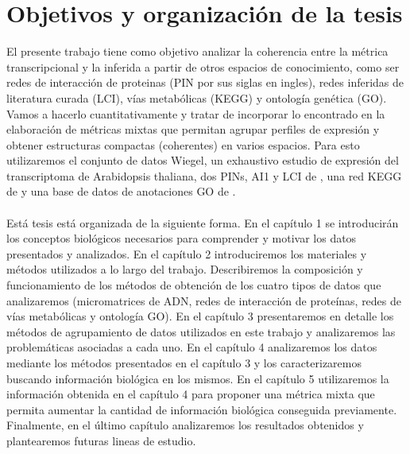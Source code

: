 \section*{Objetivos y organización de la tesis}
El presente trabajo tiene como objetivo analizar la coherencia entre la métrica transcripcional y la inferida a partir de otros espacios de conocimiento, como ser redes de interacción de proteinas (PIN por sus siglas en ingles), redes inferidas de literatura curada (LCI), vías metabólicas (KEGG) y ontología genética (GO).\\
Vamos a hacerlo cuantitativamente y tratar de incorporar lo encontrado en la elaboración de métricas mixtas que permitan agrupar perfiles de expresión y obtener estructuras compactas (coherentes) en varios espacios. Para esto utilizaremos el conjunto de datos Wiegel, un exhaustivo estudio de expresión del transcriptoma de Arabidopsis thaliana, dos PINs, AI1 y LCI de \cite{Hahn2013}, una red KEGG de \cite{Kanehisa2000} y una base de datos de anotaciones GO de \cite{org.At.tair.db2015}.\\\\

Está tesis está organizada de la siguiente forma. En el capítulo 1 se introducirán los conceptos biológicos necesarios para comprender y motivar los datos presentados y analizados. En el capítulo 2 introduciremos los materiales y métodos utilizados a lo largo del trabajo. Describiremos la composición y funcionamiento de los métodos de obtención de los cuatro tipos de datos que analizaremos (micromatrices de ADN, redes de interacción de proteínas, redes de vías metabólicas y ontología GO). En el capítulo 3 presentaremos en detalle los métodos de agrupamiento de datos utilizados en este trabajo y analizaremos las problemáticas asociadas a cada uno. En el capítulo 4 analizaremos los datos mediante los métodos presentados en el capítulo 3 y los caracterizaremos buscando información biológica en los mismos. En el capítulo 5 utilizaremos la información obtenida en el capítulo 4 para proponer una métrica mixta que permita aumentar la cantidad de información biológica conseguida previamente. Finalmente, en el último capítulo analizaremos los resultados obtenidos y plantearemos futuras lineas de estudio.